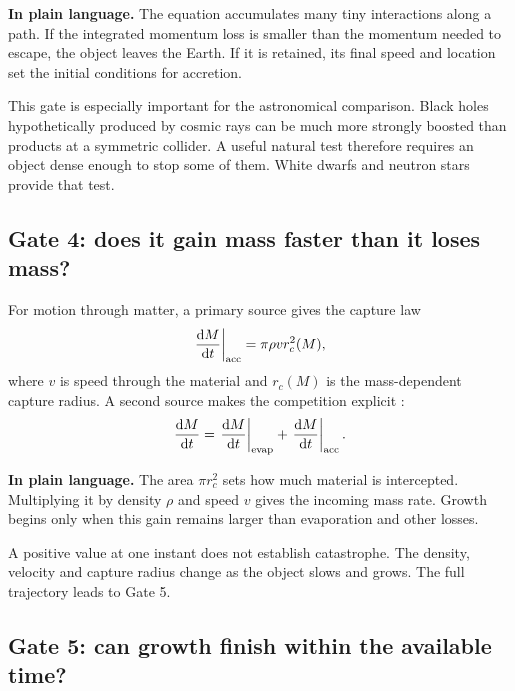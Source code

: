 \documentclass[11pt]{article}
\newcommand{\ud}{\mathrm{d}}
\newcommand{\plainmeaning}[1]{%
  \par\smallskip\noindent\begingroup\setlength{\fboxsep}{8pt}%
  \colorbox{plainbg}{\parbox{\dimexpr\linewidth-2\fboxsep\relax}{\textbf{In plain language.} #1}}%
  \endgroup\par\smallskip}
\begin{document}
\plainmeaning{The equation accumulates many tiny interactions along a path. If the integrated momentum loss is smaller than the momentum needed to escape, the object leaves the Earth. If it is retained, its final speed and location set the initial conditions for accretion.}

This gate is especially important for the astronomical comparison. Black holes hypothetically produced by cosmic rays can be much more strongly boosted than products at a symmetric collider. A useful natural test therefore requires an object dense enough to stop some of them. White dwarfs and neutron stars provide that test.

\subsection{Gate 4: does it gain mass faster than it loses mass?}

For motion through matter, a primary source gives the capture law \cite{GiddingsMangano2008}
\begin{equation}
\left.\frac{\ud M}{\ud t}\right|_{\rm acc}=\pi\rho v r_c^2(M),
\label{eq:accretion}
\end{equation}
where $v$ is speed through the material and $r_c(M)$ is the mass-dependent capture radius. A second source makes the competition explicit \cite{Casadio2009}:
\begin{equation}
\frac{\ud M}{\ud t}=
\left.\frac{\ud M}{\ud t}\right|_{\rm evap}+
\left.\frac{\ud M}{\ud t}\right|_{\rm acc}.
\label{eq:balance}
\end{equation}

\plainmeaning{The area $\pi r_c^2$ sets how much material is intercepted. Multiplying it by density $\rho$ and speed $v$ gives the incoming mass rate. Growth begins only when this gain remains larger than evaporation and other losses.}

A positive value at one instant does not establish catastrophe. The density, velocity and capture radius change as the object slows and grows. The full trajectory leads to Gate 5.

\subsection{Gate 5: can growth finish within the available time?}
\end{document}
